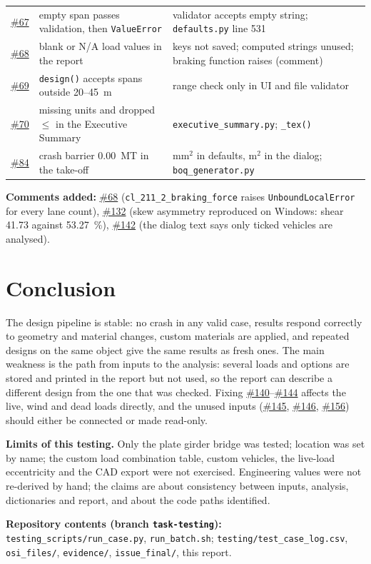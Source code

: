 \documentclass[10pt,a4paper]{article}
\newcommand{\gh}[1]{\href{https://github.com/Nidhikhare12/OsdagBridge/issues/#1}{\##1}}
\newcommand{\issPF}{\gh{145}}   %
\newcommand{\issCS}{\gh{146}}   %
\newcommand{\issBL}{\gh{156}}   %
\begin{document}
\begin{longtable}{@{}L{1.1cm}L{7.0cm}L{7.5cm}@{}}
\gh{67} & empty span passes validation, then \texttt{ValueError} & validator accepts empty string; \texttt{defaults.py} line 531\\
\gh{68} & blank or N/A load values in the report & keys not saved; computed strings unused; braking function raises (comment)\\
\gh{69} & \texttt{design()} accepts spans outside 20--45~m & range check only in UI and file validator\\
\gh{70} & missing units and dropped $\le$ in the Executive Summary & \texttt{executive\_summary.py}; \texttt{\_tex()}\\
\gh{84} & crash barrier 0.00~MT in the take-off & mm$^2$ in defaults, m$^2$ in the dialog; \texttt{boq\_generator.py}\\
\bottomrule
\end{longtable}

\textbf{Comments added:} \gh{68} (\texttt{cl\_211\_2\_braking\_force} raises \texttt{UnboundLocalError} for every lane count), \gh{132} (skew asymmetry reproduced on Windows: shear 41.73 against 53.27~\%), \gh{142} (the dialog text says only ticked vehicles are analysed).

\section{Conclusion}
The design pipeline is stable: no crash in any valid case, results respond correctly to geometry and material changes, custom materials are applied, and repeated designs on the same object give the same results as fresh ones. The main weakness is the path from inputs to the analysis: several loads and options are stored and printed in the report but not used, so the report can describe a different design from the one that was checked. Fixing \gh{140}--\gh{144} affects the live, wind and dead loads directly, and the unused inputs (\issPF, \issCS, \issBL) should either be connected or made read-only.

\textbf{Limits of this testing.} Only the plate girder bridge was tested; location was set by name; the custom load combination table, custom vehicles, the live-load eccentricity and the CAD export were not exercised. Engineering values were not re-derived by hand; the claims are about consistency between inputs, analysis, dictionaries and report, and about the code paths identified.

\textbf{Repository contents (branch \texttt{task-testing}):} \texttt{testing\_scripts/run\_case.py}, \texttt{run\_batch.sh}; \texttt{testing/test\_case\_log.csv}, \texttt{osi\_files/}, \texttt{evidence/}, \texttt{issue\_final/}, this report.
\end{document}
